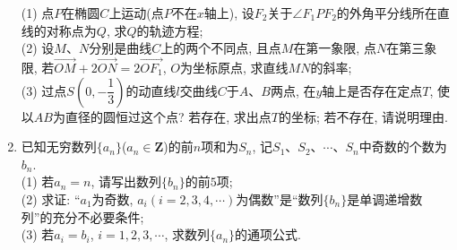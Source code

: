\documentclass[10pt,a4paper]{article}
\begin{document}
\begin{enumerate}[1.]
(1) 点$P$在椭圆$C$上运动(点$P$不在$x$轴上), 设$F_2$关于$\angle F_1PF_2$的外角平分线所在直线的对称点为$Q$, 求$Q$的轨迹方程;\\
(2) 设$M$、$N$分别是曲线$C$上的两个不同点, 且点$M$在第一象限, 点$N$在第三象限, 若$\overrightarrow{OM}+2\overrightarrow{ON}=2\overrightarrow{OF_1}$, $O$为坐标原点, 求直线$MN$的斜率;\\
(3) 过点$S(0,-\dfrac 13)$的动直线$l$交曲线$C$于$A$、$B$两点, 在$y$轴上是否存在定点$T$, 使以$AB$为直径的圆恒过这个点? 若存在, 求出点$T$的坐标; 若不存在, 请说明理由.
\item 已知无穷数列$\{a_n\}$($a_n\in \mathbf{Z}$)的前$n$项和为$S_n$, 记$S_1$、$S_2$、$\cdots$、$S_n$中奇数的个数为$b_n$.\\
(1) 若$a_n=n$, 请写出数列$\{b_n\}$的前$5$项;\\
(2) 求证: ``$a_1$为奇数, $a_i(i=2,3,4,\cdots)$为偶数''是``数列$\{b_n\}$是单调递增数列''的充分不必要条件;\\
(3) 若$a_i=b_i$, $i=1,2,3,\cdots$, 求数列$\{a_n\}$的通项公式.


\end{enumerate}
\end{document}
